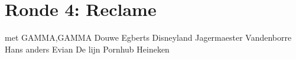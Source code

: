 
\section{Ronde 4: Reclame}
\begin{questions}

\question[2] met GAMMA,GAMMA
\vspace{5mm}
\question[2] Douwe Egberts
\vspace{5mm}
\question[2] Disneyland
\vspace{5mm}
\question[2] Jagermaester
\vspace{5mm}
\question[2] Vandenborre
\vspace{5mm}
\question[2] Hans anders
\vspace{5mm}
\question[2] Evian
\vspace{5mm}
\question[2] De lijn
\vspace{5mm}
\question[2] Pornhub
\vspace{5mm}
\question[2] Heineken

\end{questions}

\newpage
